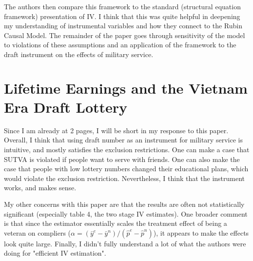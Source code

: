 \documentclass[12 pt, leqno]{article}
\begin{document}
The authors then compare this framework to the standard (structural equation framework) presentation of IV. I think that this was quite helpful in deepening my understanding of instrumental variables and how they connect to the Rubin Causal Model. The remainder of the paper goes through sensitivity of the model to violations of these assumptions and an application of the framework to the draft instrument on the effects of military service.

\section{Lifetime Earnings and the Vietnam Era Draft Lottery}

Since I am already at 2 pages, I will be short in my response to this paper. Overall, I think that using draft number as an instrument for military service is intuitive, and mostly satisfies the exclusion restrictions. One can make a case that SUTVA is violated if people want to serve with friends. One can also make the case that people with low lottery numbers changed their educational plans, which would violate the exclusion restriction. Nevertheless, I think that the instrument works, and makes sense. 

My other concerns with this paper are that the results are often not statistically significant (especially table 4, the two stage IV estimates). One broader comment is that since the estimator essentially scales the treatment effect of being a veteran on compliers ($\alpha = (\bar{y}^e - \bar{y}^n)/(\hat{p}^e -\hat{p}^n)$), it appears to make the effects look quite large. Finally, I didn't fully understand a lot of what the authors were doing for "efficient IV estimation". 
\end{document}
